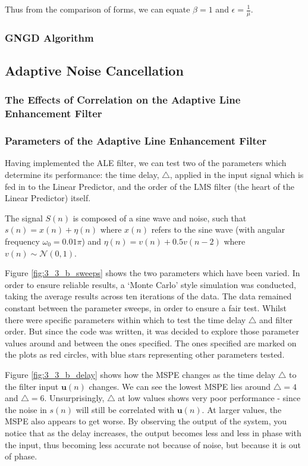 \documentclass[./main.tex]{subfiles}
\begin{document}
Thus from the comparison of forms, we can equate $ \beta = 1 $ and $ \epsilon = \frac{1}{\mu} $.

\subsubsection{GNGD Algorithm}


\subsection{Adaptive Noise Cancellation}


\subsubsection{The Effects of Correlation on the Adaptive Line Enhancement Filter}


\subsubsection{Parameters of the Adaptive Line Enhancement Filter}
Having implemented the ALE filter, we can test two of the parameters which determine its performance: the time delay, $ \bigtriangleup $, applied in the input signal which is fed in to the Linear Predictor, and the order of the LMS filter (the heart of the Linear Predictor) itself.

The signal $S(n)$ is composed of a sine wave and noise, such that $ s(n) = x(n) + \eta(n) $ where $x(n)$ refers to the sine wave (with angular frequency $ \omega_0 = 0.01\pi$) and $ \eta(n) = v(n) + 0.5v(n-2) $ where $v(n) \sim \mathcal{N}(0,1) $.

Figure \ref{fig:3_3_b_sweeps} shows the two parameters which have been varied. In order to ensure reliable results, a `Monte Carlo' style simulation was conducted, taking the average results across ten iterations of the data. The data remained constant between the parameter sweeps, in order to ensure a fair test. Whilst there were specific parameters within which to test the time delay $ \bigtriangleup $ and filter order. But since the code was written, it was decided to explore those parameter values around and between the ones specified. The ones specified are marked on the plots as red circles, with blue stars representing other parameters tested.

Figure \ref{fig:3_3_b_delay} shows how the MSPE changes as the time delay  $ \bigtriangleup $ to the filter input $ \mathbf{u}(n) $ changes. We can see the lowest MSPE lies around $ \bigtriangleup = 4 $ and $ \bigtriangleup = 6$. Unsurprisingly, $ \bigtriangleup $ at low values shows very poor performance - since the noise in $ s(n) $ will still be correlated with $ \mathbf{u}(n) $. At larger values, the MSPE also appears to get worse. By observing the output of the system, you notice that as the delay increases, the output becomes less and less in phase with the input, thus becoming less accurate not because of noise, but because it is out of phase.
\end{document}
